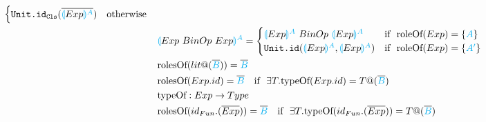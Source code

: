 \documentclass[11pt]{jarticle}
\begin{document}
\begin{alignat*}{2}
\begin{cases}
    \texttt{Unit.id}_\texttt{Cls}(\overline{\color{cyan}\llparenthesis \color{black}Exp \color{cyan}\rrparenthesis^A}) &\text{otherwise}
  \end{cases}\\
  &&&\color{cyan}\llparenthesis \color{black}Exp~BinOp~Exp \color{cyan}\rrparenthesis^A \color{black}=
  \begin{cases}
    \color{cyan}\llparenthesis \color{black}Exp \color{cyan}\rrparenthesis^A \color{black} ~BinOp~ \color{cyan}\llparenthesis \color{black}Exp \color{cyan}\rrparenthesis^A & \color{black} \text{if}~~\text{roleOf}(Exp) = \{\color{cyan}A\color{black}\}\\
    \texttt{Unit.id}(\color{cyan}\llparenthesis \color{black}Exp \color{cyan}\rrparenthesis^A \color{black}, \color{cyan}\llparenthesis \color{black}Exp \color{cyan}\rrparenthesis^A \color{black}) & \color{black} \text{if}~~\text{roleOf}(Exp) = \{\color{cyan}A'\color{black}\}
  \end{cases}\\
  &&&\text{rolesOf}(lit@(\overline{\color{cyan}B})) = {\overline{\color{cyan}B}}\\
  &&&\text{rolesOf}(Exp.id) = \overline{\color{cyan}B}~~~\text{if}~~\exists T.\text{typeOf}(Exp.id) = T@(\overline{\color{cyan}B})\\
  &&&\text{typeOf}:Exp \rightarrow Type\\
  &&&\text{rolesOf}(id_{Fun}.(\overline{Exp})) = \overline{\color{cyan}B}~~~\text{if}~~\exists T.\text{typeOf}(id_{Fun}.(\overline{Exp})) = T@(\overline{\color{cyan}B})\\
\end{alignat*}
\end{document}
